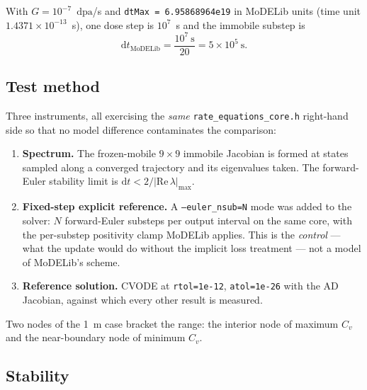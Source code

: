 \documentclass[11pt,a4paper]{article}
\newcommand{\code}[1]{\texttt{\small #1}}
\newcommand{\dpa}{\ensuremath{\mathrm{dpa}}}
\begin{document}
With $G=10^{-7}$~\dpa/s and \code{dtMax = 6.95868964e19} in MoDELib units (time
unit $1.4371\times10^{-13}$~s), one dose step is $10^{7}$~s and the immobile
substep is
\begin{equation}
\mathrm dt_{\mathrm{MoDELib}} = \frac{10^{7}\ \mathrm s}{20}
 = 5\times10^{5}\ \mathrm s .
\end{equation}

\subsection{Test method}

Three instruments, all exercising the \emph{same} \code{rate\_equations\_core.h}
right-hand side so that no model difference contaminates the comparison:

\begin{enumerate}
\item \textbf{Spectrum.} The frozen-mobile $9\times9$ immobile Jacobian is formed
      at states sampled along a converged trajectory and its eigenvalues taken.
      The forward-Euler stability limit is $\mathrm dt<2/|\mathrm{Re}\,\lambda|_{\max}$.
\item \textbf{Fixed-step explicit reference.} A \code{--euler\_nsub=N} mode was
      added to the solver: $N$ forward-Euler substeps per output interval on the
      same core, with the per-substep positivity clamp MoDELib applies. This is
      the \emph{control} --- what the update would do without the implicit loss
      treatment --- not a model of MoDELib's scheme.
\item \textbf{Reference solution.} CVODE at \code{rtol=1e-12}, \code{atol=1e-26}
      with the AD Jacobian, against which every other result is measured.
\end{enumerate}

Two nodes of the 1~\textmu m case bracket the range: the interior node of
maximum $C_v$ and the near-boundary node of minimum $C_v$.

\subsection{Stability}
\end{document}
